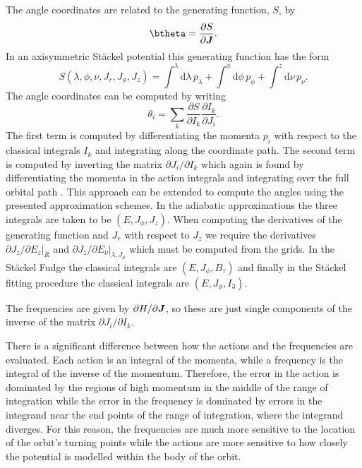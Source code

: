 \documentclass[useAMS,usenatbib,fleqn,a4paper]{mn2e}
\newcommand{\bs}[1]{\bmath{#1}}
\begin{document}
The angle
coordinates are related to the generating function, $S$, by
\begin{equation}
\btheta = \frac{\partial S}{\partial \bs{J}}.
\end{equation}
In an axisymmetric  St\"ackel  potential this generating function has the form
\begin{equation}
S(\lambda,\phi,\nu,J_r,J_\phi,J_z) = \int^\lambda\mathrm{d}\lambda\,p_\lambda
+\int^\phi\mathrm{d}\phi\,p_\phi+\int^z\mathrm{d}\nu\,p_\nu.
\end{equation}
 The angle coordinates can be computed by writing
\begin{equation}
\theta_i = \sum_k\frac{\partial S}{\partial I_k}\frac{\partial I_k}{\partial J_i}.
\end{equation}
 The first term is computed by differentiating the
momenta $p_i$ with respect to the classical integrals $I_k$ and
integrating along the coordinate path. The second term is computed by
inverting the matrix $\partial J_i/\partial I_k$ which again is found
by differentiating the momenta in the action integrals and integrating over
the full orbital path  \citep[see for example the appendix of][]{Sanders2012a}.
This approach can be extended to compute the angles using the presented
approximation schemes. In the adiabatic approximations the three integrals
are taken to be $(E,J_\phi,J_z)$. When computing the derivatives of the
generating function and $J_r$ with respect to $J_z$ we require the
derivatives $\partial J_z/\partial E_z|_R$ and $\partial J_z/\partial
E_\nu|_{\lambda,J_\phi}$ which must be computed from the grids. In the
St\"ackel Fudge the classical integrals are $(E,J_\phi,B_\tau)$ and finally
in the St\"ackel fitting procedure the classical integrals are $(E,J_\phi,I_3)$. 

The frequencies are given by
$\partial H/\partial \bs{J}$, so these are just single components of the
inverse of the matrix $\partial J_i/\partial I_k$.

There is a significant difference between how the actions and the frequencies
are evaluated. Each action is an integral of the momenta, while a frequency
is the integral of the inverse of the momentum. Therefore, the error in the
action is dominated by the regions of high momentum in the middle of the
range of integration while the error in the frequency is dominated by errors
in the integrand near the end points of the range of integration, where the
integrand diverges. For this reason, the frequencies are much more sensitive
to the location of the orbit's turning points while the actions are more
sensitive to how closely the potential is modelled within the body of the orbit.
\end{document}
